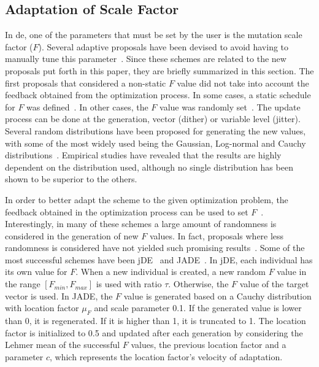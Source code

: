 \documentclass[preprint,3p]{elsarticle}
\newcommand{\DE}{{\sc de}}
\newcommand{\NP}{{\sc np}}
\begin{document}
\subsection{Adaptation of Scale Factor}

%
%
%
%
%

In \DE{}, one of the parameters that must be set by the user is the mutation scale factor ($F$).
%
Several adaptive proposals have been devised to avoid having to manually tune this parameter~\cite{Das:11}.
%
Since these schemes are related to the new proposals put forth in this paper, they are briefly summarized in this section.
%
The first proposals that considered a non-static $F$ value did not take into account the feedback obtained from the optimization process.
%
In some cases, a static schedule for $F$ was defined~\cite{Das:05b}. 
%
In other cases, the $F$ value was randomly set~\cite{Price:05}.
%
The update process can be done at the generation, vector (dither) or variable level (jitter).
%
Several random distributions have been proposed for generating the new values,
with some of the most widely used being the Gaussian, Log-normal and Cauchy distributions~\cite{Price:13}.
%
Empirical studies have revealed that the results are highly dependent on the distribution used, although
no single distribution has been shown to be superior to the others.

In order to better adapt the scheme to the given optimization problem,
the feedback obtained in the optimization process can be used to set $F$~\cite{Tvrdik:13,Zaharie:03}.
%
Interestingly, in many of these schemes %
a large amount of randomness
is considered in the generation of new $F$ values.
%
In fact, proposals where less randomness is considered have not yielded such promising results~\cite{Brest:08b}.
%
Some of the most successful schemes have been jDE~\cite{Brest:06} and JADE~\cite{Zhang:09}.
%
In jDE, each individual has its own value for $F$.
%
When a new individual is created, a new random $F$ value in the range $[F_{min}, F_{max}]$ is used with ratio $\tau$.
%
Otherwise, the $F$ value of the target vector is used.
%
In JADE, the $F$ value is generated based on a Cauchy distribution with location factor $\mu_F$ and scale parameter 0.1.
%
If the generated value is lower than 0, it is regenerated.
%
If it is higher than 1, it is truncated to 1.
%
The location factor is initialized to 0.5 and updated after each generation by considering the Lehmer mean of the successful $F$ values,
the previous location factor and a parameter $c$, which represents the location factor's velocity of adaptation.
\end{document}
